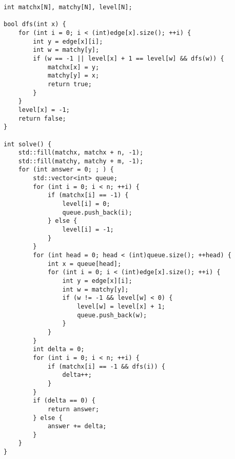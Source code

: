 \begin{lstlisting}
int matchx[N], matchy[N], level[N];
 
bool dfs(int x) {
    for (int i = 0; i < (int)edge[x].size(); ++i) {
        int y = edge[x][i];
        int w = matchy[y];
        if (w == -1 || level[x] + 1 == level[w] && dfs(w)) {
            matchx[x] = y;
            matchy[y] = x;
            return true;
        }
    }
    level[x] = -1;
    return false;
}
 
int solve() {
    std::fill(matchx, matchx + n, -1);
    std::fill(matchy, matchy + m, -1);
    for (int answer = 0; ; ) {
        std::vector<int> queue;
        for (int i = 0; i < n; ++i) {
            if (matchx[i] == -1) {
                level[i] = 0;
                queue.push_back(i);
            } else {
                level[i] = -1;
            }
        }
        for (int head = 0; head < (int)queue.size(); ++head) {
            int x = queue[head];
            for (int i = 0; i < (int)edge[x].size(); ++i) {
                int y = edge[x][i];
                int w = matchy[y];
                if (w != -1 && level[w] < 0) {
                    level[w] = level[x] + 1;
                    queue.push_back(w);
                }
            }
        }
        int delta = 0;
        for (int i = 0; i < n; ++i) {
            if (matchx[i] == -1 && dfs(i)) {
                delta++;
            }
        }
        if (delta == 0) {
            return answer;
        } else {
            answer += delta;
        }
    }
}
\end{lstlisting}
